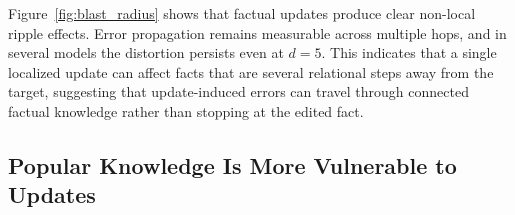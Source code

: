Figure~\ref{fig:blast_radius} shows that factual updates produce clear non-local ripple effects. 
Error propagation remains measurable across multiple hops, and in several models the distortion persists even at $d=5$. 
This indicates that a single localized update can affect facts that are several relational steps away from the target, suggesting that update-induced errors can travel through connected factual knowledge rather than stopping at the edited fact.












\subsection{Popular Knowledge Is More Vulnerable to Updates}
\label{subsec:popular_vulnerability}

